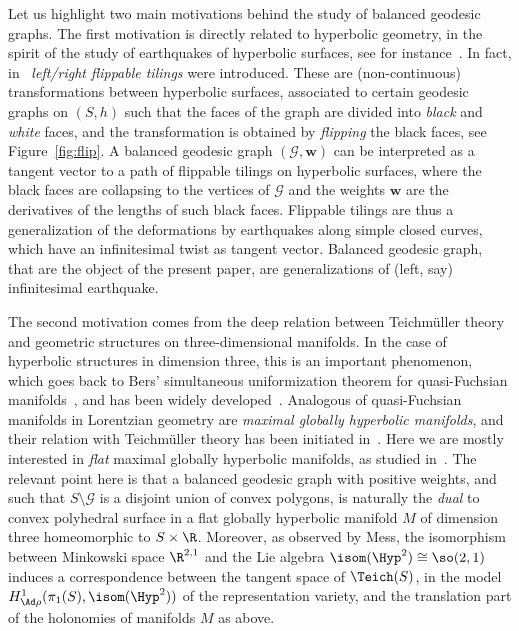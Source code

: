 Let us highlight two main motivations behind the study of balanced geodesic graphs. The first motivation is directly related to hyperbolic geometry, in the spirit of the study of earthquakes of hyperbolic surfaces, see for instance~\cite{bonahonearth,mcmullerearth,thurstonearth}. In fact, in~\cite{flippable} \emph{left/right flippable tilings} were introduced. These are (non-continuous) transformations between hyperbolic surfaces, associated to certain geodesic graphs on $(S,h)$ such that the faces of the graph are divided into \emph{black} and \emph{white} faces, and the transformation is obtained by \emph{flipping} the black faces, see Figure~\ref{fig:flip}. A balanced geodesic graph $(\mathcal G,\mathbf w)$ can be interpreted as a tangent vector to a path of flippable tilings on hyperbolic surfaces, where the black faces are collapsing to the vertices of $\mathcal G$ and the weights $\mathbf w$ are the derivatives of the lengths of such black faces. Flippable tilings are thus a generalization of the deformations by earthquakes along simple closed curves, which have an infinitesimal twist as tangent vector. Balanced geodesic graph, that are the object of the present paper, are generalizations of (left, say) infinitesimal earthquake.

The second motivation comes from the deep relation between Teichm\"uller theory and geometric structures on three-dimensional manifolds. In the case of hyperbolic structures in dimension three, this is an important phenomenon, which goes back to Bers' simultaneous uniformization theorem for quasi-Fuchsian manifolds~\cite{bers}, and has been widely developed~\cite{bonahonbouts,BrockWPconvexcore,seppiminimal,taubes,uhlenbeck}. Analogous of quasi-Fuchsian manifolds in Lorentzian geometry are \emph{maximal globally hyperbolic manifolds}, and their relation with Teichm\"uller theory has been initiated in~\cite{mess}. Here we are mostly interested in \emph{flat} maximal globally hyperbolic manifolds, as studied in~\cite{barbot,Bonsante,bonseppicodazzi}. The relevant point here is that a balanced geodesic graph {with positive weights, and such that $S\setminus\mathcal{G}$ is a disjoint union of convex polygons,} is naturally the \emph{dual} to convex polyhedral surface in a flat globally hyperbolic manifold $M$ of dimension three {homeomorphic to $S\times \R$}. Moreover, as observed by Mess, the isomorphism between Minkowski space $\R^{2,1}$ and the Lie algebra $\isom(\Hyp^2)\linebreak\cong\so(2,1)$ induces a correspondence between the tangent space of $\Teich(S)$, in the model $H^1_{\Ad\rho}(\pi_1(S),\isom(\Hyp^2))$ of the representation variety, and the translation part of the holonomies of manifolds $M$ as above.

